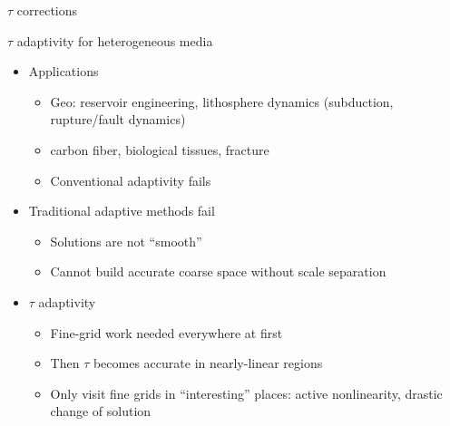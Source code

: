 \documentclass{beamer}
\begin{document}
\begin{frame}{$\tau$ corrections}
\begin{figure}
\end{figure}
\end{frame}

\begin{frame}{$\tau$ adaptivity for heterogeneous media}
  \begin{itemize}
  \item Applications
    \begin{itemize}
    \item Geo: reservoir engineering, lithosphere dynamics (subduction, rupture/fault dynamics)
    \item carbon fiber, biological tissues, fracture
    \item Conventional adaptivity fails
    \end{itemize}
  \item Traditional adaptive methods fail
    \begin{itemize}
    \item Solutions are not ``smooth''
    \item Cannot build accurate coarse space without scale separation
    \end{itemize}
  \item $\tau$ adaptivity
    \begin{itemize}
    \item Fine-grid work needed everywhere at first
    \item Then $\tau$ becomes accurate in nearly-linear regions
    \item Only visit fine grids in ``interesting'' places: active nonlinearity, drastic change of solution
    \end{itemize}
  \end{itemize}
\end{frame}
\end{document}
